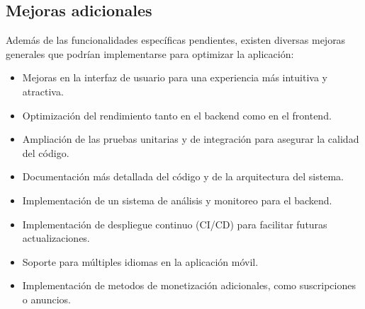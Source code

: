 \subsection{Mejoras adicionales}
Además de las funcionalidades específicas pendientes, existen diversas mejoras generales que podrían 
implementarse para optimizar la aplicación:
\begin{itemize}
    \item Mejoras en la interfaz de usuario para una experiencia más intuitiva y atractiva.
    \item Optimización del rendimiento tanto en el backend como en el frontend.
    \item Ampliación de las pruebas unitarias y de integración para asegurar la calidad del código.
    \item Documentación más detallada del código y de la arquitectura del sistema.
    \item Implementación de un sistema de análisis y monitoreo para el backend.
    \item Implementación de despliegue continuo (CI/CD) para facilitar futuras actualizaciones.
    \item Soporte para múltiples idiomas en la aplicación móvil.
    \item Implementación de metodos de monetización adicionales, como suscripciones o anuncios.
\end{itemize}